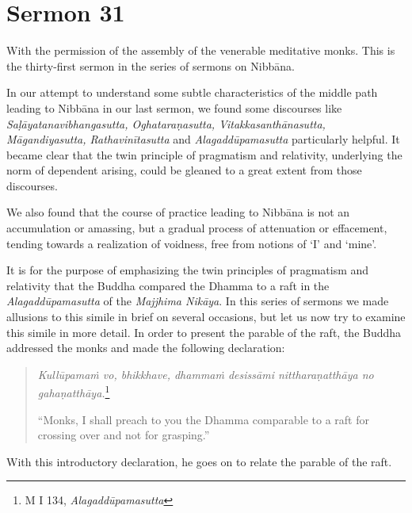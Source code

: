\chapter{Sermon 31}

\NibbanaOpeningQuote

With the permission of the assembly of the venerable meditative monks. This is the thirty-first sermon in the series of sermons on Nibbāna.

In our attempt to understand some subtle characteristics of the middle path leading to Nibbāna in our last sermon, we found some discourses like \emph{Saḷāyatanavibhangasutta, Oghataraṇasutta, Vitakkasanthānasutta, Māgandiyasutta, Rathavinītasutta} and \emph{Alagaddūpamasutta} particularly helpful. It became clear that the twin principle of pragmatism and relativity, underlying the norm of dependent arising, could be gleaned to a great extent from those discourses.

We also found that the course of practice leading to Nibbāna is not an accumulation or amassing, but a gradual process of attenuation or effacement, tending towards a realization of voidness, free from notions of `I' and `mine'.

It is for the purpose of emphasizing the twin principles of pragmatism and relativity that the Buddha compared the Dhamma to a raft in the \emph{Alagaddūpamasutta} of the \emph{Majjhima Nikāya}. In this series of sermons we made allusions to this simile in brief on several occasions, but let us now try to examine this simile in more detail. In order to present the parable of the raft, the Buddha addressed the monks and made the following declaration:

\begin{quote}
\emph{Kullūpamaṁ vo, bhikkhave, dhammaṁ desissāmi nittharaṇatthāya no gahaṇatthāya.}\footnote{M I 134, \emph{Alagaddūpamasutta}}

``Monks, I shall preach to you the Dhamma comparable to a raft for crossing over and not for grasping.''
\end{quote}

With this introductory declaration, he goes on to relate the parable of the raft.

